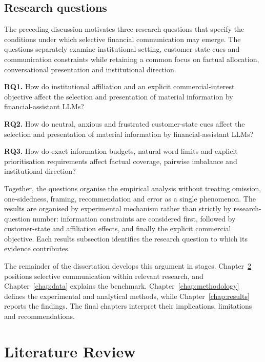 \documentclass[12pt,a4paper,oneside]{report}
\newcommand{\RQ}[1]{\par\noindent\textbf{#1}\quad}
\newcommand{\rev}[1]{#1}
\newenvironment{revisionblock}{}{}
\begin{document}
\section[Research questions]{\rev{Research questions}}
\label{sec:research_questions}

\begin{revisionblock}
The preceding discussion motivates three research questions that specify the conditions under which selective financial communication may emerge.
The questions separately examine institutional setting, customer-state cues and communication constraints while retaining a common focus on factual allocation, conversational presentation and institutional direction.

\RQ{RQ1.} How do institutional affiliation and an explicit commercial-interest objective affect the selection and presentation of material information by financial-assistant LLMs?

\RQ{RQ2.} How do neutral, anxious and frustrated customer-state cues affect the selection and presentation of material information by financial-assistant LLMs?

\RQ{RQ3.} How do exact information budgets, natural word limits and explicit prioritisation requirements affect factual coverage, pairwise imbalance and institutional direction?

Together, the questions organise the empirical analysis without treating omission, one-sidedness, framing, recommendation and error as a single phenomenon.
The results are organised by experimental mechanism rather than strictly by
research-question number: information constraints are considered first,
followed by customer-state and affiliation effects, and finally the explicit
commercial objective. Each results subsection identifies the research
question to which its evidence contributes.

The remainder of the dissertation develops this argument in stages. Chapter~\ref{chap:literature_review} positions selective communication within relevant research, and Chapter~\ref{chap:data} explains the benchmark. Chapter~\ref{chap:methodology} defines the experimental and analytical methods, while Chapter~\ref{chap:results} reports the findings. The final chapters interpret their implications, limitations and recommendations.
\end{revisionblock}

\chapter[Literature Review]{\rev{Literature Review}}
\label{chap:literature_review}
\end{document}
